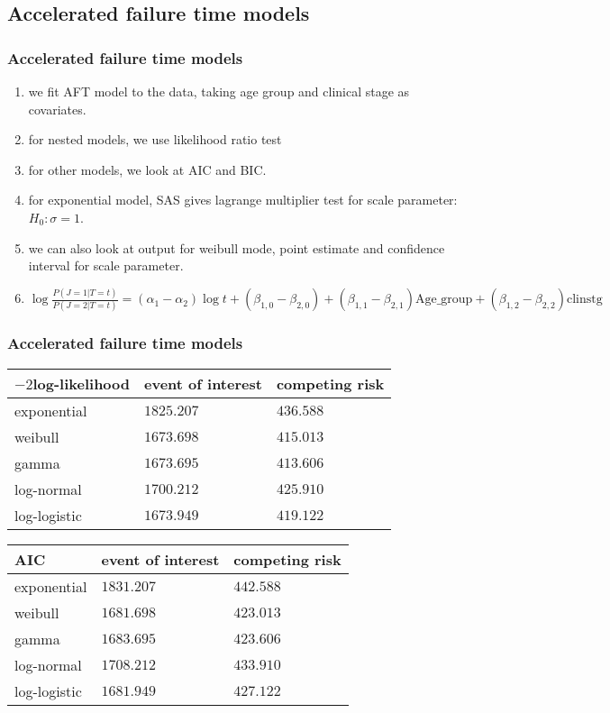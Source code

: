 \documentclass{beamer}[10]
\begin{document}
\subsection{Accelerated failure time models}
\begin{frame}
	\frametitle{Accelerated failure time models}
	\begin{enumerate}
		\item we fit AFT model to the data, taking age group and clinical stage as covariates.
		\item  for nested models, we use likelihood ratio test
		\item  for other models, we look at AIC and BIC.
		\item for exponential model, SAS gives lagrange multiplier test for  scale parameter: $H_0: \sigma = 1$.
		\item we can also look at output for weibull mode, point estimate and confidence interval for scale parameter.
		\item $\log\frac{P(J = 1|T= t)}{P(J = 2|T = t)} = (\alpha_1 - \alpha_2)\log t + (\beta_{1, 0} - \beta_{2, 0}) + (\beta_{1, 1} - \beta_{2, 1})\text{Age}\_\text{group} + (\beta_{1, 2} - \beta_{2, 2})\text{clinstg}$
	\end{enumerate}
\end{frame}
\begin{frame}
	\frametitle{Accelerated failure time models}
	\begin{center}
\begin{tabular}{lll}
	\hline
	$-2$log-likelihood&event of interest&competing risk\\
	\hline
	exponential&$1825.207$& $436.588$\\
	weibull&$1673.698$& $415.013$\\
	gamma&$1673.695$& $413.606$\\
	log-normal& $1700.212$& $425.910$\\
	log-logistic&$1673.949$& $419.122$\\
	\hline
\end{tabular}
\end{center}
\begin{center}
\begin{tabular}{lll}
	\hline
	AIC&event of interest&competing risk\\
	\hline
	exponential&$1831.207$&$442.588$\\
	weibull&$1681.698$& $423.013$\\
	gamma&$1683.695$& $423.606$\\
	log-normal&$1708.212$& $433.910$\\
	log-logistic&$1681.949$&$427.122$\\
	\hline
\end{tabular}
\end{center}
\end{frame}
\end{document}
